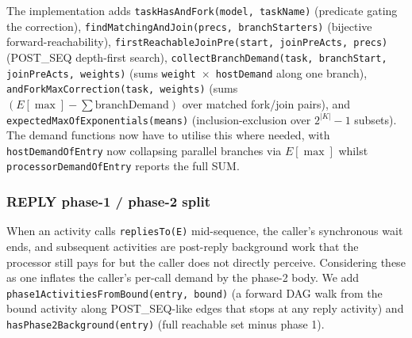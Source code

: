 The implementation adds \texttt{taskHasAndFork(model, taskName)} (predicate gating the correction), \texttt{findMatchingAndJoin(precs, branchStarters)} (bijective forward-reachability), \texttt{firstReachableJoinPre(start, joinPreActs, precs)} (POST\_SEQ depth-first search), \texttt{collectBranchDemand(task, branchStart, joinPreActs, weights)} (sums \texttt{weight $\times$ hostDemand} along one branch), \texttt{andForkMaxCorrection(task, weights)} (sums $(E[\max] - \sum \text{branchDemand})$ over matched fork/join pairs), and \texttt{expectedMaxOfExponentials(means)} (inclusion-exclusion over $2^{|K|}-1$ subsets). The demand functions now have to utilise this where needed, with \texttt{hostDemandOfEntry} now collapsing parallel branches via $E[\max]$ whilst \texttt{processorDemandOfEntry} reports the full SUM.



\subsubsection*{REPLY phase-1 / phase-2 split}

When an activity calls \texttt{repliesTo(E)} mid-sequence, the caller's synchronous wait ends, and subsequent activities are post-reply background work that the processor still pays for but the caller does not directly perceive. Considering these as one inflates the caller's per-call demand by the phase-2 body. We add \texttt{phase1ActivitiesFromBound(entry, bound)} (a forward DAG walk from the bound activity along POST\_SEQ-like edges that stops at any reply activity) and \texttt{hasPhase2Background(entry)} (full reachable set minus phase 1). 

